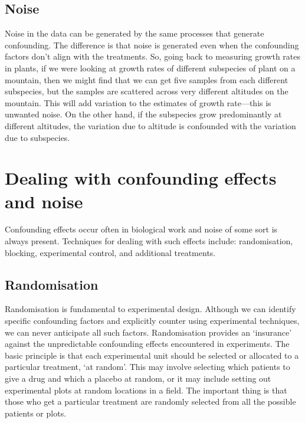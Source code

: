 \documentclass[
]{book}
\begin{document}
\hypertarget{noise}{%
\subsection{Noise}\label{noise}}

Noise in the data can be generated by the same processes that generate confounding. The difference is that noise is generated even when the confounding factors don't align with the treatments. So, going back to measuring growth rates in plants, if we were looking at growth rates of different subspecies of plant on a mountain, then we might find that we can get five samples from each different subspecies, but the samples are scattered across very different altitudes on the mountain. This will add variation to the estimates of growth rate---this is unwanted noise. On the other hand, if the subspecies grow predominantly at different altitudes, the variation due to altitude is confounded with the variation due to subspecies.

\hypertarget{dealing-with-confounding-effects-and-noise}{%
\section{Dealing with confounding effects and noise}\label{dealing-with-confounding-effects-and-noise}}

Confounding effects occur often in biological work and noise of some sort is always present. Techniques for dealing with such effects include: randomisation, blocking, experimental control, and additional treatments.

\hypertarget{randomisation}{%
\subsection{Randomisation}\label{randomisation}}

Randomisation is fundamental to experimental design. Although we can identify specific confounding factors and explicitly counter using experimental techniques, we can never anticipate all such factors. Randomisation provides an `insurance' against the unpredictable confounding effects encountered in experiments. The basic principle is that each experimental unit should be selected or allocated to a particular treatment, `at random'. This may involve selecting which patients to give a drug and which a placebo at random, or it may include setting out experimental plots at random locations in a field. The important thing is that those who get a particular treatment are randomly selected from all the possible patients or plots.
\end{document}
